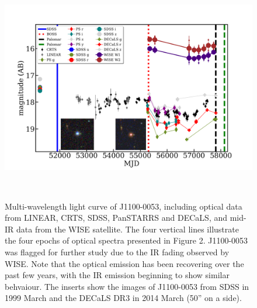 \documentclass{nature}
\begin{document}
\begin{figure}
  \centering
  \includegraphics[width=16.00cm, height=10.00cm, trim=0.0cm 0.0cm 0.0cm 0.0cm, clip]
  {../plots/lc/J110057_lc_20180222v1.png}
  \caption[]{
    Multi-wavelength light curve of J1100-0053, including optical data
    from LINEAR, CRTS, SDSS, PanSTARRS and DECaLS, and mid-IR data from
    the WISE satellite.  The four vertical lines illustrate the four
    epochs of optical spectra presented in Figure 2.  J1100-0053 was
    flagged for further study due to the IR fading observed by WISE.  Note
    that the optical emission has been recovering over the past few years,
    with the IR emission beginning to show similar behvaiour. The inserts
    show the images of J1100-0053 from SDSS in 1999 March and the DECaLS DR3
    in 2014 March (50'' on a side). }
  \label{fig:J110057_LC_CRTS}
\end{figure}
\end{document}
